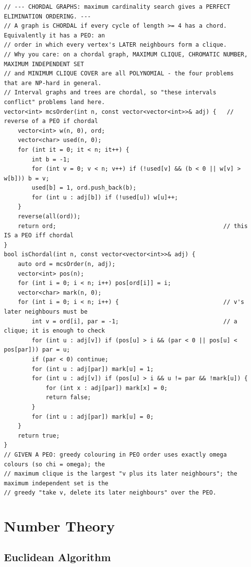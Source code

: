 \documentclass[9pt,a4paper,twocolumn]{extarticle}
\begin{document}
\begin{lstlisting}
// --- CHORDAL GRAPHS: maximum cardinality search gives a PERFECT ELIMINATION ORDERING. ---
// A graph is CHORDAL if every cycle of length >= 4 has a chord. Equivalently it has a PEO: an
// order in which every vertex's LATER neighbours form a clique.
// Why you care: on a chordal graph, MAXIMUM CLIQUE, CHROMATIC NUMBER, MAXIMUM INDEPENDENT SET
// and MINIMUM CLIQUE COVER are all POLYNOMIAL - the four problems that are NP-hard in general.
// Interval graphs and trees are chordal, so "these intervals conflict" problems land here.
vector<int> mcsOrder(int n, const vector<vector<int>>& adj) {   // reverse of a PEO if chordal
    vector<int> w(n, 0), ord;
    vector<char> used(n, 0);
    for (int it = 0; it < n; it++) {
        int b = -1;
        for (int v = 0; v < n; v++) if (!used[v] && (b < 0 || w[v] > w[b])) b = v;
        used[b] = 1, ord.push_back(b);
        for (int u : adj[b]) if (!used[u]) w[u]++;
    }
    reverse(all(ord));
    return ord;                                                // this IS a PEO iff chordal
}
bool isChordal(int n, const vector<vector<int>>& adj) {
    auto ord = mcsOrder(n, adj);
    vector<int> pos(n);
    for (int i = 0; i < n; i++) pos[ord[i]] = i;
    vector<char> mark(n, 0);
    for (int i = 0; i < n; i++) {                              // v's later neighbours must be
        int v = ord[i], par = -1;                              // a clique; it is enough to check
        for (int u : adj[v]) if (pos[u] > i && (par < 0 || pos[u] < pos[par])) par = u;
        if (par < 0) continue;
        for (int u : adj[par]) mark[u] = 1;
        for (int u : adj[v]) if (pos[u] > i && u != par && !mark[u]) {
            for (int x : adj[par]) mark[x] = 0;
            return false;
        }
        for (int u : adj[par]) mark[u] = 0;
    }
    return true;
}
// GIVEN A PEO: greedy colouring in PEO order uses exactly omega colours (so chi = omega); the
// maximum clique is the largest "v plus its later neighbours"; the maximum independent set is the
// greedy "take v, delete its later neighbours" over the PEO.
\end{lstlisting}

\section{Number Theory}

\subsection{Euclidean Algorithm}
\end{document}
